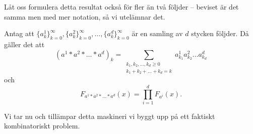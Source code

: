 \documentclass[nobib]{tufte-handout}
\begin{document}
Låt oss formulera detta resultat också för fler än två följder -- beviset är det samma men med mer notation, så vi utelämnar det.

\begin{lemma}\label{lemma_convolution_many_seqs}
    Antag att $\{a^1_k\}_{k=0}^\infty, \{a^2_k\}_{k=0}^\infty, \ldots, \{a^d_k\}_{k=0}^\infty$ är en samling av $d$ stycken följder. Då gäller det att
    $$(a^1*a^2*\ldots*a^d)_k = \sum_{\substack{k_1, k_2, \ldots, k_d \geq 0\\k_1 + k_2 + \ldots + k_d = k}} a^1_{k_1}a^2_{k_2}\ldots a^d_{k_d}$$
    och
    $$F_{a^1 * a^2 * \ldots * a^d}(x) = \prod_{i=1}^{d} F_{a^i}(x).$$
\end{lemma}

Vi tar nu och tillämpar detta maskineri vi byggt upp på ett faktiskt kombinatoriskt problem.
\end{document}

